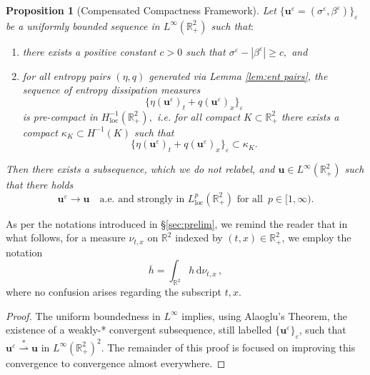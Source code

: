 \documentclass[11pt,a4paper,reqno]{amsart}
\numberwithin{equation}{section}
\newtheorem{prop}[lemma]{Proposition}
\theoremstyle{definition}
\theoremstyle{remark}
\newcommand{\bu}{\mathbf{u}}
\renewcommand{\d}{\, \mathrm{d}}
\newcommand{\loc}{\mathrm{loc}}
\renewcommand{\geq}{\geqslant}
\begin{document}
{\begin{prop}[Compensated Compactness Framework]\label{lem:comp comp}
    Let $\{\bu^\varepsilon=(\sigma^\varepsilon,\beta^\varepsilon)\}_\varepsilon$  be a uniformly bounded sequence in $L^\infty(\mathbb{R}^2_+)$ such that$:$ 
    \begin{enumerate}
        \item[(i)] there exists a positive constant $c>0$ such that $\sigma^\varepsilon- |\beta^\varepsilon| \geq c,$ and 
        \item[(ii)] for all entropy pairs $(\eta,q)$ generated via Lemma \ref{lem:ent pairs}, the sequence of entropy dissipation measures 
        $$\big\{\eta(\bu^\varepsilon)_t + q(\bu^\varepsilon)_x \big\}_\varepsilon$$ 
        is pre-compact in $H^{-1}_\loc(\mathbb{R}^2_+),$ \textit{i.e.} for all compact $K \subset \mathbb{R}^2_+$ there exists a compact $\kappa_K \subset H^{-1}(K)$ such that $$\big\{\eta(\bu^\varepsilon)_t + q(\bu^\varepsilon)_x \big\}_\varepsilon \subset \kappa_K.$$
    \end{enumerate}
    Then there exists a subsequence, which we do not relabel, and $\bu \in L^\infty(\mathbb{R}^2_+)$ such that there holds 
    \begin{equation*}
        \bu^\varepsilon \to \bu \quad \text{a.e.~and strongly in } L^p_\loc(\mathbb{R}^2_+) \text{ for all }\, p \in [1,\infty). 
    \end{equation*}
\end{prop}


As per the notations introduced in \S \ref{sec:prelim}, we remind the reader that in what follows, for a measure $\nu_{t,x}$ on $\mathbb{R}^2$ indexed by $(t,x) \in \mathbb{R}^2_+$, we employ the notation 
\begin{equation*}
    \overline{h} = \int_{\mathbb{R}^2} h \d \nu_{t,x} \, ,
\end{equation*}
where no confusion arises regarding the subscript $t,x$. 



\begin{proof}
  The uniform boundedness in $L^\infty$ implies, using Alaoglu's Theorem, the existence of a weakly-* convergent subsequence, still labelled $\{\bu^\varepsilon\}_\varepsilon$, such that $\bu^\varepsilon \overset{*}{\rightharpoonup} \bu$ in $L^\infty(\mathbb{R}^2_+)^2$. The remainder of this proof is focused on improving this convergence to convergence almost everywhere.

    



\end{proof}}
\end{document}

